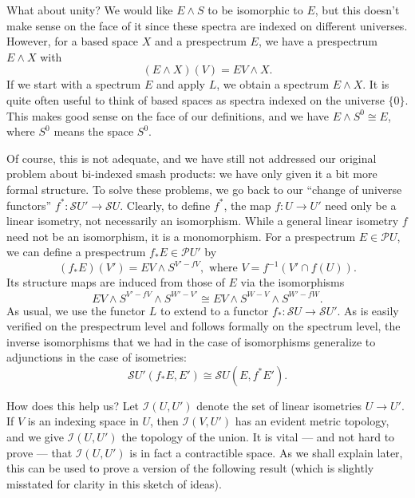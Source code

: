 What about unity? We would like $E \wedge S$ to be isomorphic to $E$, but this doesn't make sense on the face of it since these spectra are indexed on different universes. However, for a based space $X$ and a prespectrum $E$, we have a prespectrum $E \wedge X$ with
\[ (E \wedge X)(V) = EV \wedge X. \]
If we start with a spectrum $E$ and apply $L$, we obtain a spectrum $E \wedge X$. It is quite often useful to think of based spaces as spectra indexed on the universe $\{0\}$. This makes good sense on the face of our definitions, and we have $E \wedge S^0 \cong E$, where $S^0$ means the space $S^0$.

Of course, this is not adequate, and we have still not addressed our original problem about bi-indexed smash products: we have only given it a bit more formal structure. To solve these problems, we go back to our ``change of universe functors'' $f^*: \mathscr{S}U' \longrightarrow \mathscr{S}U$. Clearly, to define $f^*$, the map $f: U \longrightarrow U'$ need only be a linear isometry, not necessarily an isomorphism. While a general linear isometry $f$ need not be an isomorphism, it is a monomorphism. For a prespectrum $E \in \mathscr{P}U$, we can define a prespectrum $f_*E \in \mathscr{P}U'$ by
\begin{equation}
    (f_*E)(V') = EV \wedge S^{V' - fV}, \text{ where } V = f^{-1}(V' \cap f(U)).
\end{equation}
Its structure maps are induced from those of $E$ via the isomorphisms
\begin{equation}
    EV \wedge S^{V' - fV} \wedge S^{W' - V'} \cong EV \wedge S^{W - V} \wedge S^{W' - fW}.
\end{equation}
As usual, we use the functor $L$ to extend to a functor $f_*: \mathscr{S}U \longrightarrow \mathscr{S}U'$. As is easily verified on the prespectrum level and follows formally on the spectrum level, the inverse isomorphisms that we had in the case of isomorphisms generalize to adjunctions in the case of isometries:
\begin{equation}
    \mathscr{S}U'(f_*E, E') \cong \mathscr{S}U(E, f^*E').
\end{equation}

How does this help us? Let $\mathscr{I}(U, U')$ denote the set of linear isometries $U \longrightarrow U'$. If $V$ is an indexing space in $U$, then $\mathscr{I}(V, U')$ has an evident metric topology, and we give $\mathscr{I}(U, U')$ the topology of the union. It is vital --- and not hard to prove --- that $\mathscr{I}(U, U')$ is in fact a contractible space. As we shall explain later, this can be used to prove a version of the following result (which is slightly misstated for clarity in this sketch of ideas).

